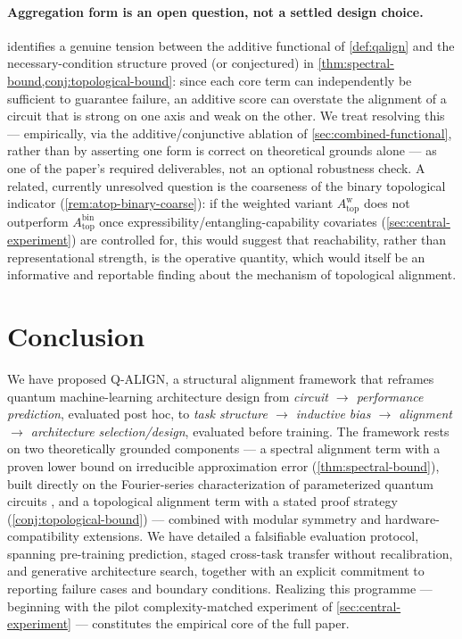 \documentclass[11pt]{article}
\newcommand{\Atop}{A_{\mathrm{top}}}
\begin{document}
\paragraph{Aggregation form is an open question, not a settled design choice.}  identifies a genuine tension between the additive functional of \cref{def:qalign} and the necessary-condition structure proved (or conjectured) in \cref{thm:spectral-bound,conj:topological-bound}: since each core term can independently be sufficient to guarantee failure, an additive score can overstate the alignment of a circuit that is strong on one axis and weak on the other. We treat resolving this --- empirically, via the additive/conjunctive ablation of \cref{sec:combined-functional}, rather than by asserting one form is correct on theoretical grounds alone --- as one of the paper's required deliverables, not an optional robustness check. A related, currently unresolved question is the coarseness of the binary topological indicator (\cref{rem:atop-binary-coarse}): if the weighted variant $\Atop^{\mathrm{w}}$ does not outperform $\Atop^{\mathrm{bin}}$ once expressibility/entangling-capability covariates (\cref{sec:central-experiment}) are controlled for, this would suggest that reachability, rather than representational strength, is the operative quantity, which would itself be an informative and reportable finding about the mechanism of topological alignment.

\section{Conclusion}
\label{sec:conclusion}

We have proposed Q-ALIGN, a structural alignment framework that reframes quantum machine-learning architecture design from \emph{circuit $\rightarrow$ performance prediction}, evaluated post hoc, to \emph{task structure $\rightarrow$ inductive bias $\rightarrow$ alignment $\rightarrow$ architecture selection/design}, evaluated before training. The framework rests on two theoretically grounded components --- a spectral alignment term with a proven lower bound on irreducible approximation error (\cref{thm:spectral-bound}), built directly on the Fourier-series characterization of parameterized quantum circuits \citep{schuld2021effect}, and a topological alignment term with a stated proof strategy (\cref{conj:topological-bound}) --- combined with modular symmetry and hardware-compatibility extensions. We have detailed a falsifiable evaluation protocol, spanning pre-training prediction, staged cross-task transfer without recalibration, and generative architecture search, together with an explicit commitment to reporting failure cases and boundary conditions. Realizing this programme --- beginning with the pilot complexity-matched experiment of \cref{sec:central-experiment} --- constitutes the empirical core of the full paper.


\end{document}
